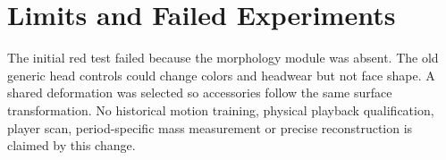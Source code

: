 \documentclass{article}
\begin{document}
\section{Limits and Failed Experiments}
The initial red test failed because the morphology module was absent.
The old generic head controls could change colors and headwear but not face
shape. A shared deformation was selected so accessories follow the same
surface transformation. No historical motion training, physical playback
qualification, player scan, period-specific mass measurement or precise
reconstruction is claimed by this change.
\end{document}
